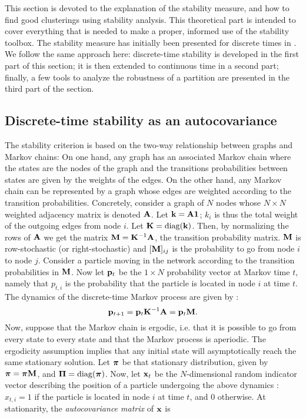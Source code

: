This section is devoted to the explanation of the stability measure, and how to find good clusterings using stability analysis. This theoretical part is intended to cover everything that is needed to make a proper, informed use of the stability toolbox. The stability measure has initially been presented for discrete times in \cite{delvenne2010stability}. We follow the same approach here: discrete-time stability is developed in the first part of this section; it is then extended to continuous time in a second part; finally, a few tools to analyze the robustness of a partition are presented in the third part of the section.

\subsection{Discrete-time stability as an autocovariance}
The stability criterion is based on the two-way relationship between graphs and Markov chains: On one hand, any graph has an associated Markov chain where the states are the nodes of the graph and the transitions probabilities between states are given by the weights of the edges. On the other hand, any Markov chain can be represented by a graph whose edges are weighted according to the transition probabilities. Concretely, consider a graph of $N$ nodes whose $N \times N$ weighted adjacency matrix is denoted $\mathbf A$. Let $\mathbf k = \mathbf A \mathbf 1$; $k_i$ is thus the total weight of the outgoing edges from node $i$. Let $\mathbf K = \mathrm{diag}(\mathbf k)$. Then, by normalizing the rows of $\mathbf A$ we get the matrix $\mathbf M = \mathbf K^{-1}\mathbf A$, the transition probability matrix. $\mathbf M$ is row-stochastic (or right-stochastic) and $[\mathbf M]_{ij}$ is the probability to go from node $i$ to node $j$. 
Consider a particle moving in the network according to the transition probabilities in $\mathbf M$. Now let $\mathbf p_t$ be the $1 \times N$ probability vector at Markov time $t$, namely that $p_{t,i}$ is the probability that the particle is located in node $i$ at time $t$. The dynamics of the discrete-time Markov process are given by :
\begin{equation} \label{eq:discreteMP}
	\mathbf p_{t+1} = \mathbf p_t \mathbf K^{-1}\mathbf A = \mathbf p_t \mathbf M.  	
\end{equation} 
Now, suppose that the Markov chain is ergodic, i.e. that it is possible to go from every state to every state and that the Markov process is aperiodic. The ergodicity assumption implies that any initial state will asymptotically reach the same stationary solution. Let $\boldsymbol \pi$ be that stationary distribution, given by $\boldsymbol \pi = \boldsymbol \pi \mathbf M$, and $\mathbf \Pi = \mathrm{diag}(\boldsymbol \pi)$. Now, let $\mathbf x_t$ be the $N$-dimensional random indicator vector describing the position of a particle undergoing the above dynamics : $x_{t,i} = 1$ if the particle is located in node $i$ at time $t$, and $0$ otherwise. At stationarity, the \textit{autocovariance matrix} of $\mathbf x$ is
